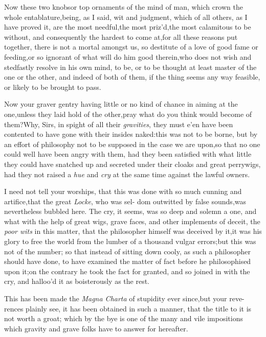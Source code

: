 \documentclass{article}
\begin{document}
Now these two knobs\tsh or top ornaments of the mind of man,
which crown the whole entablature,\tsk being, as I said, wit and
judgment, which of all others, as I have proved it, are the most
needful,\tsh the most priz’d,\tsh the most calamitous to be
without, and consequently the hardest to come at,\tsk for all
these reasons put together, there is not a mortal amongst us, so
destitute of a love of good fame or feeding,\tsh or so ignorant
of what will do him good therein,\tsk who does not wish and
stedfastly resolve in his own mind, to be, or to be thought at
least master of the one or the other, and indeed of both of
them, if the thing seems any way feasible, or likely to be\break
brought to pass.

Now your graver gentry having little or no kind of chance in
aiming at the one,\tsk unless they laid hold of the
other,\tsh pray what do you think would become of
them?\tsk Why, Sirs, in spight of all their
\textit{gravities}, they must e’en have been contented to have
gone with their insides naked:\tsk this was not to be
borne, but by an effort of philosophy not to be supposed in the
case we are upon,\tsh so that no one could well have been
angry with them, had they been satisfied with what little they
could have snatched up and secreted under their cloaks and great
perrywigs, had they not raised a \textit{hue} and \textit{cry} at the
same time against the lawful owners.

I need not tell your worships, that this was done with so much
cunning and artifice,\tsk that the great \textit{Locke},
who was sel- dom outwitted by false
sounds,\tsk was nevertheless bubbled here. The cry, it
seems, was so deep and solemn a one, and what with the help of
great wigs, grave faces, and other implements of deceit,
 the \textit{poor wits} in this
matter, that the phi\-losopher himself was deceived by it,\tsk it
was his glory to free the world from the lumber of a thousand
vulgar errors;\tsh but this was not of the number; so that
instead of sitting down cooly, as such a philosopher should have
done, to have examined the matter of fact before he philosophised
upon it;\tsk on the contra\-ry he took the fact for granted, and so
joined in with the cry, and halloo’d it as boisterously as
the rest.

This has been made the \textit{Magna Charta} of stupidity ever
since,\tsh but your reve- rences plainly see, it has been
obtained in such a manner, that the title to it is not worth a
groat; \tsh which by the bye is one of the many and vile
impositions which gravity and grave folks have to an\-swer for
hereafter.
\end{document}
